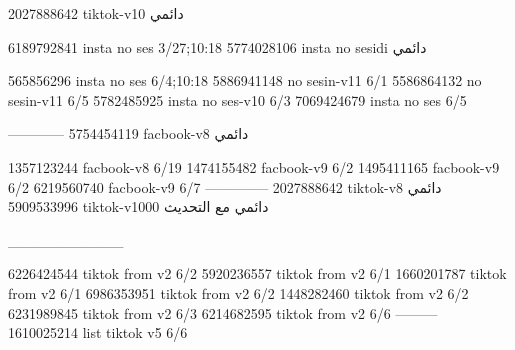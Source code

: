 2027888642 tiktok-v10
دائمي

6189792841 insta no ses
3/27;10:18
5774028106 insta no sesidi
دائمي

565856296 insta no ses
6/4;10:18
5886941148 no sesin-v11
6/1
5586864132 no sesin-v11
6/5
5782485925 insta no ses-v10
6/3
7069424679 insta no ses
6/5

------------
5754454119 facbook-v8
دائمي

1357123244 facbook-v8
6/19
1474155482 facbook-v9
6/2
1495411165 facbook-v9
6/2
6219560740 facbook-v9
6/7
--------------
2027888642 tiktok-v8
دائمي
5909533996 tiktok-v1000
دائمي مع التحديث

___________

6226424544 tiktok from v2
6/2
5920236557 tiktok from v2
6/1
1660201787 tiktok from v2
6/1
6986353951 tiktok from v2
6/2
1448282460 tiktok from v2
6/2
6231989845 tiktok from v2
6/3
6214682595 tiktok from v2
6/6
---------
1610025214 list tiktok v5
6/6
